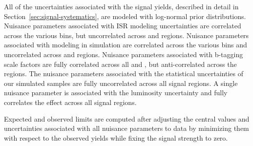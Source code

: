 All of the uncertainties associated with the signal yields, described in detail
in Section~\ref{sec:signal-systematics}, are modeled with log-normal prior distributions.  
Nuisance parameters associated with ISR modeling uncertainties are correlated 
across the various \nj bins, but uncorrelated across \nb and \ptmiss regions.  
Nuisance parameters associated with \ptmiss modeling in simulation are
correlated across the various \ptmiss bins and uncorrelated across \nb and 
\nj regions.  Nuisance parameters associated with b-tagging scale factors are fully correlated
across all \ptmiss and \nj, but anti-correlated across the \nb regions. The nuisance 
parameters associated with the statistical uncertainties of our simulated samples
are fully uncorrelated across all signal regions. A single nuisance parameter
is associated with the luminosity uncertainty and fully correlates the effect
across all signal regions. 

Expected and observed limits are computed after adjusting the central values
and uncertainties associated with all nuisance parameters to data by minimizing 
them with respect to the observed yields while fixing the signal strength to
zero.

